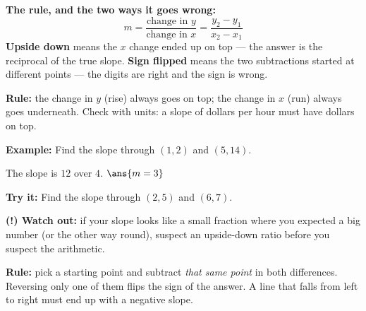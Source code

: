 \documentclass[12pt]{article}
\begin{document}

\begin{formulabox}
\textbf{The rule, and the two ways it goes wrong:}
\[
  m = \frac{\text{change in } y}{\text{change in } x}
    = \frac{y_2 - y_1}{x_2 - x_1}
\]
\textbf{Upside down} means the $x$ change ended up on top --- the answer is
the reciprocal of the true slope. \textbf{Sign flipped} means the two
subtractions started at different points --- the digits are right and the sign
is wrong.
\end{formulabox}


\begin{formulabox}
\textbf{Rule:} the change in $y$ (rise) always goes on top; the change in $x$
(run) always goes underneath. Check with units: a slope of dollars per hour
must have dollars on top.
\end{formulabox}

\begin{examplebox}
\textbf{Example:} \quad Find the slope through $(1, 2)$ and $(5, 14)$.

The slope is $12$ over $4$. \quad $\ans{m = 3}$
\end{examplebox}

\begin{tryitbox}
\textbf{Try it:} \quad Find the slope through $(2, 5)$ and $(6, 7)$.\\[2pt]
\end{tryitbox}

\begin{watchoutbox}
\textbf{(!) Watch out:} if your slope looks like a small fraction where you
expected a big number (or the other way round), suspect an upside-down ratio
before you suspect the arithmetic.
\end{watchoutbox}


\begin{formulabox}
\textbf{Rule:} pick a starting point and subtract \emph{that same point}
in both differences. Reversing only one of them flips the sign of the answer.
A line that falls from left to right must end up with a negative slope.
\end{formulabox}
\end{document}
